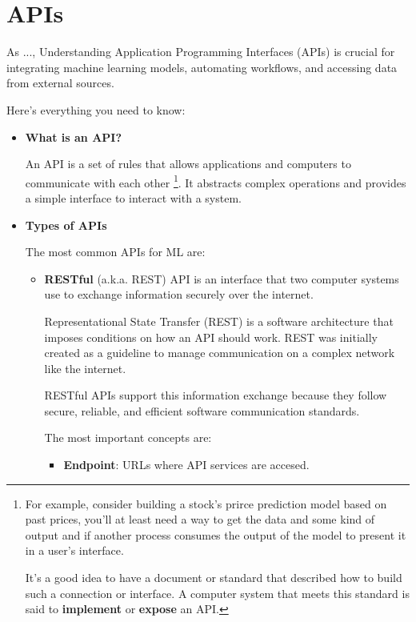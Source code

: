 \section{APIs}

As ..., 
Understanding Application Programming Interfaces (APIs) is crucial
for integrating machine learning models, automating workflows, and
accessing data from external sources.

Here's everything you need to know:
\begin{itemize}
    \item \textbf{What is an API?}

    \noinent
    An API is a set of rules that allows applications and computers
    to communicate with each other
    \footnote{
        For example, consider building a stock's prirce prediction
        model based on past prices, you'll at least need a way to
        get the data and some kind of output and if another process
        consumes the output of the model to present it in a user's 
        interface.
        
        It's a good idea to have a document or standard that described
        how to build such a connection or interface. A computer system
        that meets this standard is said to \textbf{implement} or 
        \textbf{expose} an API.
    }.
    It abstracts complex operations and provides a simple interface
    to interact with a system.



    \item \textbf{Types of APIs}

    \noindent
    The most common APIs for ML are:
    \begin{itemize}
        \item \textbf{RESTful} (a.k.a. REST) API is an interface that
        two computer systems use to exchange information securely over
        the internet.
        
        Representational State Transfer (REST) is a software architecture
        that imposes conditions on how an API should work. REST was
        initially created as a guideline to manage communication on a
        complex network like the internet. 

        RESTful APIs support this information exchange because they
        follow secure, reliable, and efficient software communication
        standards.

        The most important concepts are:
        \begin{itemize}
            \item \textbf{Endpoint}: URLs where API services are accesed.
            

\end{itemize}
\end{itemize}
\end{itemize}
